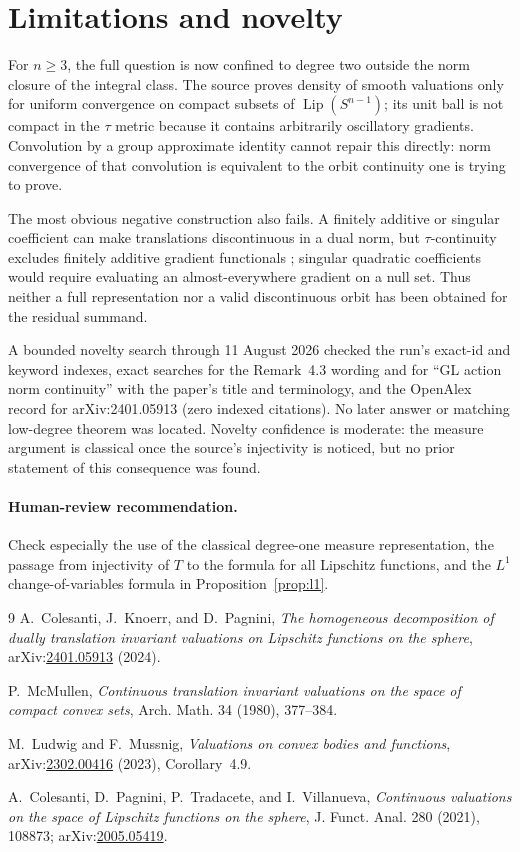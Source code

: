 \documentclass[11pt]{article}
\newcommand{\Lip}{\operatorname{Lip}}
\begin{document}
\section{Limitations and novelty}

For $n\geq3$, the full question is now confined to degree two outside the
norm closure of the integral class.  The source proves density of smooth
valuations only for uniform convergence on compact subsets of
$\Lip(S^{n-1})$; its unit ball is not compact in the $\tau$ metric because it
contains arbitrarily oscillatory gradients.  Convolution by a group
approximate identity cannot repair this directly: norm convergence of that
convolution is equivalent to the orbit continuity one is trying to prove.

The most obvious negative construction also fails.  A finitely additive or
singular coefficient can make translations discontinuous in a dual norm, but
$\tau$-continuity excludes finitely additive gradient functionals
\cite{CPTV}; singular quadratic coefficients would require evaluating an
almost-everywhere gradient on a null set.  Thus neither a full representation
nor a valid discontinuous orbit has been obtained for the residual summand.

A bounded novelty search through 11 August 2026 checked the run's exact-id and
keyword indexes, exact searches for the Remark~4.3 wording and for
``GL action norm continuity'' with the paper's title and terminology, and the
OpenAlex record for arXiv:2401.05913 (zero indexed citations).  No later answer
or matching low-degree theorem was located.  Novelty confidence is moderate:
the measure argument is classical once the source's injectivity is noticed,
but no prior statement of this consequence was found.

\paragraph{Human-review recommendation.}
Check especially the use of the classical degree-one measure representation,
the passage from injectivity of $T$ to the formula for all Lipschitz
functions, and the $L^1$ change-of-variables formula in
Proposition~\ref{prop:l1}.

\begin{thebibliography}{9}
A.~Colesanti, J.~Knoerr, and D.~Pagnini,
\emph{The homogeneous decomposition of dually translation invariant
valuations on Lipschitz functions on the sphere},
arXiv:\href{https://arxiv.org/abs/2401.05913}{2401.05913} (2024).

P.~McMullen,
\emph{Continuous translation invariant valuations on the space of compact
convex sets},
Arch. Math. 34 (1980), 377--384.

M.~Ludwig and F.~Mussnig,
\emph{Valuations on convex bodies and functions},
arXiv:\href{https://arxiv.org/abs/2302.00416}{2302.00416} (2023),
Corollary~4.9.

A.~Colesanti, D.~Pagnini, P.~Tradacete, and I.~Villanueva,
\emph{Continuous valuations on the space of Lipschitz functions on the
sphere},
J. Funct. Anal. 280 (2021), 108873;
arXiv:\href{https://arxiv.org/abs/2005.05419}{2005.05419}.
\end{thebibliography}
\end{document}
